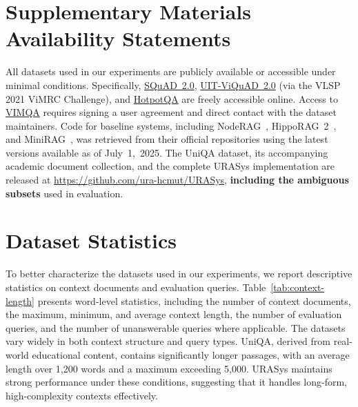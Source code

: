 \documentclass[11pt]{article}
\begin{document}
\section*{Supplementary Materials Availability Statements}

All datasets used in our experiments are publicly available or accessible under minimal conditions. Specifically, \href{https://huggingface.co/datasets/rajpurkar/squad_v2}{SQuAD~2.0}, \href{https://huggingface.co/datasets/taidng/UIT-ViQuAD2.0}{UIT-ViQuAD~2.0} (via the VLSP 2021 ViMRC Challenge), and \href{https://hotpotqa.github.io/}{HotpotQA} are freely accessible online. Access to \href{https://github.com/vimqa/vimqa/}{VIMQA} requires signing a user agreement and direct contact with the dataset maintainers. Code for baseline systems, including NodeRAG~\cite{xu2025noderag}, HippoRAG~2~\cite{gutierrez2025rag}, and MiniRAG~\cite{fan2025minirag}, was retrieved from their official repositories using the latest versions available as of July~1,~2025. The UniQA dataset, its accompanying academic document collection, and the complete URASys implementation are released at \url{https://github.com/ura-hcmut/URASys}, \textbf{including the ambiguous subsets} used in evaluation.













\appendix

\section{Dataset Statistics}
\label{sec:dataset-statistics}

To better characterize the datasets used in our experiments, we report descriptive statistics on context documents and evaluation queries. Table~\ref{tab:context-length} presents word-level statistics, including the number of context documents, the maximum, minimum, and average context length, the number of evaluation queries, and the number of unanswerable queries where applicable. The datasets vary widely in both context structure and query types. UniQA, derived from real-world educational content, contains significantly longer passages, with an average length over 1{,}200 words and a maximum exceeding 5{,}000. URASys maintains strong performance under these conditions, suggesting that it handles long-form, high-complexity contexts effectively.
\end{document}
